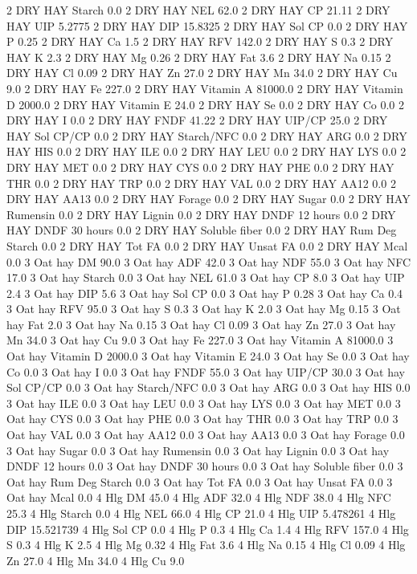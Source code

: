 \documentclass[letterpaper,10pt,english]{sphinxmanual}
\begin{document}
\begin{sphinxVerbatim}[commandchars=\\\{\},numbers=left,firstnumber=1,stepnumber=1]
2 DRY HAY Starch 0.0
2 DRY HAY NEL 62.0
2 DRY HAY CP 21.11
2 DRY HAY UIP 5.2775
2 DRY HAY DIP 15.8325
2 DRY HAY Sol CP 0.0
2 DRY HAY P 0.25
2 DRY HAY Ca 1.5
2 DRY HAY RFV 142.0
2 DRY HAY S 0.3
2 DRY HAY K 2.3
2 DRY HAY Mg 0.26
2 DRY HAY Fat 3.6
2 DRY HAY Na 0.15
2 DRY HAY Cl 0.09
2 DRY HAY Zn 27.0
2 DRY HAY Mn 34.0
2 DRY HAY Cu 9.0
2 DRY HAY Fe 227.0
2 DRY HAY Vitamin A 81000.0
2 DRY HAY Vitamin D 2000.0
2 DRY HAY Vitamin E 24.0
2 DRY HAY Se 0.0
2 DRY HAY Co 0.0
2 DRY HAY I 0.0
2 DRY HAY FNDF 41.22
2 DRY HAY UIP/CP 25.0
2 DRY HAY Sol CP/CP 0.0
2 DRY HAY Starch/NFC 0.0
2 DRY HAY ARG 0.0
2 DRY HAY HIS 0.0
2 DRY HAY ILE 0.0
2 DRY HAY LEU 0.0
2 DRY HAY LYS 0.0
2 DRY HAY MET 0.0
2 DRY HAY CYS 0.0
2 DRY HAY PHE 0.0
2 DRY HAY THR 0.0
2 DRY HAY TRP 0.0
2 DRY HAY VAL 0.0
2 DRY HAY AA\PYGZsh{}12 0.0
2 DRY HAY AA\PYGZsh{}13 0.0
2 DRY HAY \PYGZpc{} Forage 0.0
2 DRY HAY Sugar \PYGZpc{} 0.0
2 DRY HAY Rumensin 0.0
2 DRY HAY Lignin 0.0
2 DRY HAY DNDF 12 hours 0.0
2 DRY HAY DNDF 30 hours 0.0
2 DRY HAY Soluble fiber 0.0
2 DRY HAY Rum Deg Starch 0.0
2 DRY HAY Tot FA 0.0
2 DRY HAY Unsat FA 0.0
2 DRY HAY Mcal 0.0
3 Oat hay DM 90.0
3 Oat hay ADF 42.0
3 Oat hay NDF 55.0
3 Oat hay NFC 17.0
3 Oat hay Starch 0.0
3 Oat hay NEL 61.0
3 Oat hay CP 8.0
3 Oat hay UIP 2.4
3 Oat hay DIP 5.6
3 Oat hay Sol CP 0.0
3 Oat hay P 0.28
3 Oat hay Ca 0.4
3 Oat hay RFV 95.0
3 Oat hay S 0.3
3 Oat hay K 2.0
3 Oat hay Mg 0.15
3 Oat hay Fat 2.0
3 Oat hay Na 0.15
3 Oat hay Cl 0.09
3 Oat hay Zn 27.0
3 Oat hay Mn 34.0
3 Oat hay Cu 9.0
3 Oat hay Fe 227.0
3 Oat hay Vitamin A 81000.0
3 Oat hay Vitamin D 2000.0
3 Oat hay Vitamin E 24.0
3 Oat hay Se 0.0
3 Oat hay Co 0.0
3 Oat hay I 0.0
3 Oat hay FNDF 55.0
3 Oat hay UIP/CP 30.0
3 Oat hay Sol CP/CP 0.0
3 Oat hay Starch/NFC 0.0
3 Oat hay ARG 0.0
3 Oat hay HIS 0.0
3 Oat hay ILE 0.0
3 Oat hay LEU 0.0
3 Oat hay LYS 0.0
3 Oat hay MET 0.0
3 Oat hay CYS 0.0
3 Oat hay PHE 0.0
3 Oat hay THR 0.0
3 Oat hay TRP 0.0
3 Oat hay VAL 0.0
3 Oat hay AA\PYGZsh{}12 0.0
3 Oat hay AA\PYGZsh{}13 0.0
3 Oat hay \PYGZpc{} Forage 0.0
3 Oat hay Sugar \PYGZpc{} 0.0
3 Oat hay Rumensin 0.0
3 Oat hay Lignin 0.0
3 Oat hay DNDF 12 hours 0.0
3 Oat hay DNDF 30 hours 0.0
3 Oat hay Soluble fiber 0.0
3 Oat hay Rum Deg Starch 0.0
3 Oat hay Tot FA 0.0
3 Oat hay Unsat FA 0.0
3 Oat hay Mcal 0.0
4 Hlg DM 45.0
4 Hlg ADF 32.0
4 Hlg NDF 38.0
4 Hlg NFC 25.3
4 Hlg Starch 0.0
4 Hlg NEL 66.0
4 Hlg CP 21.0
4 Hlg UIP 5.478261
4 Hlg DIP 15.521739
4 Hlg Sol CP 0.0
4 Hlg P 0.3
4 Hlg Ca 1.4
4 Hlg RFV 157.0
4 Hlg S 0.3
4 Hlg K 2.5
4 Hlg Mg 0.32
4 Hlg Fat 3.6
4 Hlg Na 0.15
4 Hlg Cl 0.09
4 Hlg Zn 27.0
4 Hlg Mn 34.0
4 Hlg Cu 9.0

\end{sphinxVerbatim}
\end{document}
